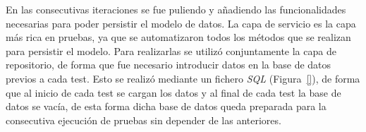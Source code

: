 

En las consecutivas iteraciones se fue puliendo y añadiendo las funcionalidades necesarias para poder persistir el modelo de datos.
La capa de servicio es la capa más rica en pruebas, ya que se automatizaron todos los métodos que se realizan para persistir el modelo. Para realizarlas se utilizó conjuntamente la capa de repositorio, de forma que fue necesario introducir datos en la base de datos previos a cada test. Esto se realizó mediante un fichero \emph{SQL} (Figura~\ref{}), de forma que al inicio de cada test se cargan los datos y al final de cada test la base de datos se vacía, de esta forma dicha base de datos queda preparada para la consecutiva ejecución de pruebas sin depender de las anteriores.


